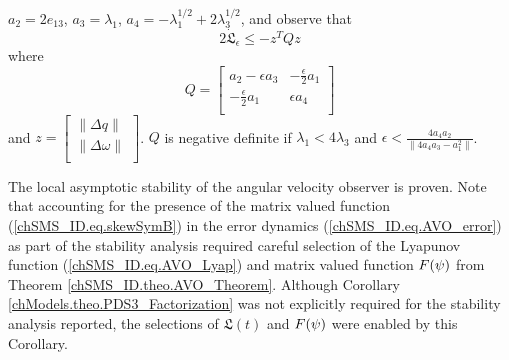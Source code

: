$a_2=2e_{13}$, $a_3=\lambda_1$,
$a_4=-\lambda_1^{1/2}+2\lambda_3^{1/2}$, and observe that 
%
\begin{equation}
2 \dot{\mathfrak{L}}_\epsilon\leq -z^T Q z
\end{equation}
%
where
%
\begin{equation}
 Q=\left[ \begin{array}{cc}
a_2-\epsilon a_3  &  -\frac{\epsilon}{2}a_1  \\
-\frac{\epsilon}{2}a_1 & \epsilon a_4\\
\end{array} \right] 
\end{equation}
%
and $z=\left[ \begin{array}{c}
    \|\Delta q\| \\    \|\Delta \omega \| \\
  \end{array} \right]$.
$Q$ is negative definite if $\lambda_1<4\lambda_3$  and 
$\epsilon<\frac{4 a_4 a_2}{\| 4 a_4 a_3 -a_1^2\|}$.

The local asymptotic stability of the angular velocity observer is
proven.  Note that accounting for the presence of the matrix valued
function (\ref{chSMS_ID.eq.skewSymB}) in the error dynamics
(\ref{chSMS_ID.eq.AVO_error}) as part of the stability analysis
required careful selection of the Lyapunov function
(\ref{chSMS_ID.eq.AVO_Lyap}) and matrix valued function
$F(\psi)$ from Theorem
\ref{chSMS_ID.theo.AVO_Theorem}. Although Corollary
\ref{chModels.theo.PDS3_Factorization} was not explicitly required for
the stability analysis reported, the selections of $\mathfrak{L}(t)$
and $F(\psi)$ were enabled by this Corollary.






